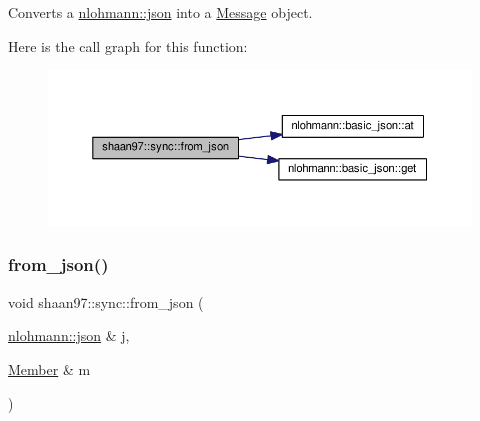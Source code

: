 Converts a {\ttfamily \hyperlink{namespacenlohmann_a2bfd99e845a2e5cd90aeaf1b1431f474}{nlohmann\+::json}} into a {\ttfamily \hyperlink{structshaan97_1_1sync_1_1_message}{Message}} object. 

Here is the call graph for this function\+:\nopagebreak
\begin{figure}[H]
\begin{center}
\leavevmode
\includegraphics[width=350pt]{group___serialization_gaba06015bb8b13049b093f0bde8e89377_cgraph}
\end{center}
\end{figure}
\mbox{\label{group___serialization_ga35dd3deb42a1ec52e00a2980b5c7c842}} 
\subsubsection{\texorpdfstring{from\+\_\+json()}{from\_json()}\hspace{0.1cm}{\footnotesize\ttfamily [2/2]}}
{\footnotesize\ttfamily void shaan97\+::sync\+::from\+\_\+json (\begin{DoxyParamCaption}\item[{\hyperlink{namespacenlohmann_a2bfd99e845a2e5cd90aeaf1b1431f474}{nlohmann\+::json} \&}]{j,  }\item[{\hyperlink{classshaan97_1_1sync_1_1_member}{Member} \&}]{m }\end{DoxyParamCaption})}

